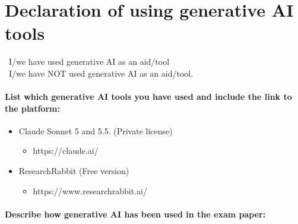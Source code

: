 \section*{Declaration of using generative AI tools}


\tickbox[]\ I/we have used generative AI as an aid/tool \\
\tickbox[x]\ I/we have NOT used generative AI as an aid/tool.

\paragraph{List which generative AI tools you have used and include the link to the platform:}

\begin{itemize}
    \item Claude Sonnet 5 and 5.5. (Private license)
    \begin{itemize}
        \item https://claude.ai/
    \end{itemize}
    \item ResearchRabbit (Free version)
    \begin{itemize}
        \item https://www.researchrabbit.ai/
    \end{itemize}
\end{itemize}

\paragraph{Describe how generative AI has been used in the exam paper:}

